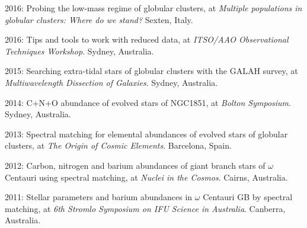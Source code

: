 \item[{\color{numcolor}\scriptsize7}] 2016: Probing the low-mass regime of globular clusters, at  \textit{Multiple populations in globular clusters: Where do we stand?} Sexten, Italy.
\item[{\color{numcolor}\scriptsize6}] 2016: Tips and tools to work with reduced data, at  \textit{ITSO/AAO Observational Techniques Workshop}. Sydney, Australia.
\item[{\color{numcolor}\scriptsize5}] 2015: Searching extra-tidal stars of globular clusters with the GALAH survey, at  \textit{Multiwavelength Dissection of Galaxies}. Sydney, Australia.
\item[{\color{numcolor}\scriptsize4}] 2014: C+N+O abundance of evolved stars of NGC1851, at  \textit{Bolton Symposium}. Sydney, Australia.
\item[{\color{numcolor}\scriptsize3}] 2013: Spectral matching for elemental abundances of evolved stars of globular clusters, at \textit{The Origin of Cosmic Elements}. Barcelona, Spain.
\item[{\color{numcolor}\scriptsize2}] 2012: Carbon, nitrogen and barium abundances of giant branch stars of $\omega$ Centauri using spectral matching, at \textit{Nuclei in the Cosmos}. Cairns, Australia.
\item[{\color{numcolor}\scriptsize1}] 2011: Stellar parameters and barium abundances in $\omega$ Centauri GB by spectral matching, at  \textit{6th Stromlo Symposium on IFU Science in Australia}. Canberra, Australia.
